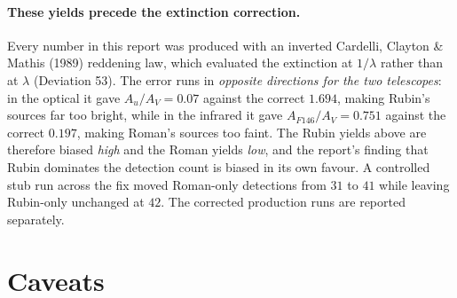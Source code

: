 \documentclass[english,10pt,a4paper]{article}
\begin{document}
\paragraph{These yields precede the extinction correction.} Every number in this report was
produced with an inverted Cardelli, Clayton \& Mathis (1989) reddening law, which evaluated the
extinction at $1/\lambda$ rather than at $\lambda$ (Deviation 53). The error runs in
\emph{opposite directions for the two telescopes}: in the optical it gave $A_u/A_V = 0.07$ against
the correct $1.694$, making Rubin's sources far too bright, while in the infrared it gave
$A_{F146}/A_V = 0.751$ against the correct $0.197$, making Roman's sources too faint. The Rubin
yields above are therefore biased \emph{high} and the Roman yields \emph{low}, and the report's
finding that Rubin dominates the detection count is biased in its own favour. A controlled stub
run across the fix moved Roman-only detections from $31$ to $41$ while leaving Rubin-only
unchanged at $42$. The corrected production runs are reported separately.

\section{Caveats}
\end{document}
